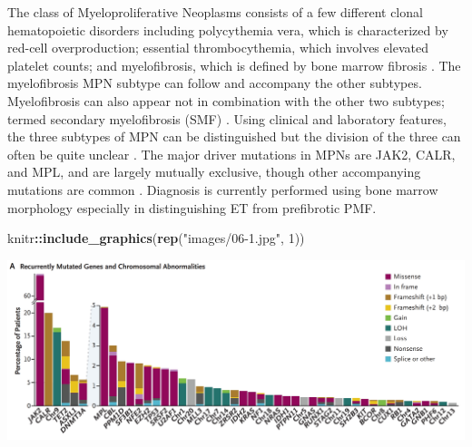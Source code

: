 \documentclass[]{book}
\newenvironment{Shaded}{\begin{snugshade}}{\end{snugshade}}
\newcommand{\DataTypeTok}[1]{\textcolor[rgb]{0.13,0.29,0.53}{#1}}
\newcommand{\DecValTok}[1]{\textcolor[rgb]{0.00,0.00,0.81}{#1}}
\newcommand{\KeywordTok}[1]{\textcolor[rgb]{0.13,0.29,0.53}{\textbf{#1}}}
\newcommand{\NormalTok}[1]{#1}
\newcommand{\OperatorTok}[1]{\textcolor[rgb]{0.81,0.36,0.00}{\textbf{#1}}}
\newcommand{\OtherTok}[1]{\textcolor[rgb]{0.56,0.35,0.01}{#1}}
\newcommand{\StringTok}[1]{\textcolor[rgb]{0.31,0.60,0.02}{#1}}
\begin{document}
The class of Myeloproliferative Neoplasms consists of a few different clonal hematopoietic disorders including polycythemia vera, which is characterized by red-cell overproduction; essential thrombocythemia, which involves elevated platelet counts; and myelofibrosis, which is defined by bone marrow fibrosis \citep{grinfeld2018classification}. The myelofibrosis MPN subtype can follow and accompany the other subtypes. Myelofibrosis can also appear not in combination with the other two subtypes; termed secondary myelofibrosis (SMF) \citep{mesa2012epidemiology}. Using clinical and laboratory features, the three subtypes of MPN can be distinguished but the division of the three can often be quite unclear \citep{wilkins2008bone, tefferi2014overview}. The major driver mutations in MPNs are JAK2, CALR, and MPL, and are largely mutually exclusive, though other accompanying mutations are common \citep{tefferi2015myeloproliferative}. Diagnosis is currently performed using bone marrow morphology especially in distinguishing ET from prefibrotic PMF.

\begin{Shaded}
\begin{Highlighting}[]
\NormalTok{knitr}\OperatorTok{::}\KeywordTok{include_graphics}\NormalTok{(}\KeywordTok{rep}\NormalTok{(}\StringTok{"images/06-1.jpg"}\NormalTok{, }\DecValTok{1}\NormalTok{))          }
\end{Highlighting}
\end{Shaded}

\includegraphics{images/06-1.jpg}

\begin{Shaded}
\end{Shaded}
\end{document}
